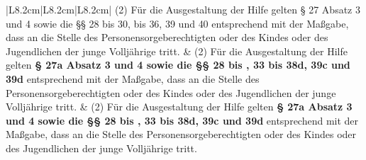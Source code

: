 \documentclass[10pt,a4paper,landscape]{article}
\begin{document}
\begin{longtable}{|L{8.2cm}|L{8.2cm}|L{8.2cm}|}
(2) Für die Ausgestaltung der Hilfe gelten \S{}  \newline \textcolor{diffred}{27} Absatz 3 und 4 sowie die \S{}\S{} 28 bis 30,   bis \textcolor{diffred}{36, 39} und \textcolor{diffred}{40} entsprechend mit der  \newline Maßgabe, dass an die Stelle des  \newline Personensorgeberechtigten oder des  \newline Kindes oder des Jugendlichen der junge  \newline Volljährige tritt. & (2) Für die Ausgestaltung der Hilfe gelten \textbf{\S{}  \newline 27a Absatz 3 und 4 sowie die \S{}\S{} 28 bis  , 33 bis 38d, 39c und 39d }entsprechend  \newline mit der Maßgabe, dass an die Stelle des  \newline Personensorgeberechtigten oder des  \newline Kindes oder des Jugendlichen der junge  \newline Volljährige tritt. & (2) Für die Ausgestaltung der Hilfe gelten \textbf{\S{}  \newline 27a Absatz 3 und 4 sowie die \S{}\S{} 28 bis  , 33 bis 38d, 39c und 39d }entsprechend  \newline mit der Maßgabe, dass an die Stelle des  \newline Personensorgeberechtigten oder des  \newline Kindes oder des Jugendlichen der junge  \newline Volljährige tritt. \\
\hhline{|---|}

\end{longtable}
\end{document}
